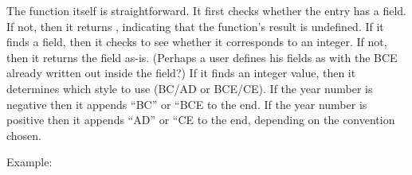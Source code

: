 \documentclass[letterpaper,10pt,english]{sphinxmanual}
\begin{document}
The  function itself is straightforward. It first checks whether the entry has a  field. If not, then it returns , indicating that the function’s result is undefined. If it finds a  field, then it checks to see whether it corresponds to an integer. If not, then it returns the field as-is. (Perhaps a user defines his  fields as  with the BCE already written out inside the field?) If it finds an integer value, then it determines which style to use (BC/AD or BCE/CE). If the year number is negative then it appends “BC” or “BCE to the end. If the year number is positive then it appends “AD” or “CE to the end, depending on the convention chosen.

Example:
\end{document}
